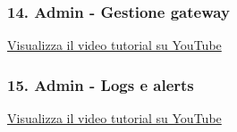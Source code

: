 \subsubsection{14. Admin - Gestione gateway}
\href{https://www.youtube.com/watch?v=PjySMOLCtMA&list=PLPKYjnuIh1FA3b3jn_bwY_ztYzaFn2mIT&index=17}
{Visualizza il video tutorial su YouTube}

\subsubsection{15. Admin - Logs e alerts}
\href{https://www.youtube.com/watch?v=PjySMOLCtMA&list=PLPKYjnuIh1FA3b3jn_bwY_ztYzaFn2mIT&index=18}
{Visualizza il video tutorial su YouTube}
